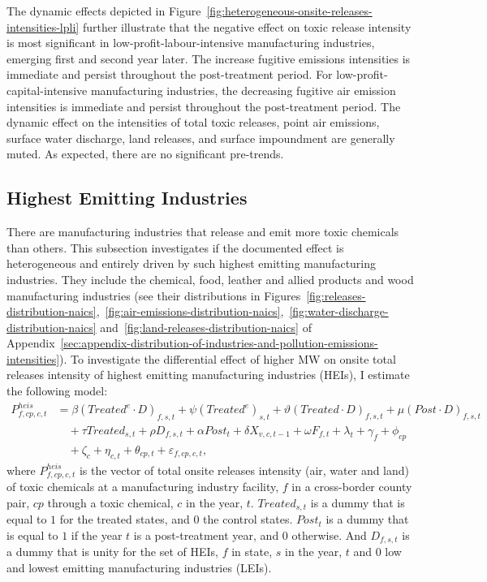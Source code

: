 \documentclass[12pt, english]{article}
\begin{document}
    The dynamic effects depicted in Figure~\ref{fig:heterogeneous-onsite-releases-intensities-lpli} further illustrate that the negative effect on toxic release intensity is most significant in low-profit-labour-intensive manufacturing industries, emerging first and second year later. The increase fugitive emissions intensities is immediate and persist throughout the post-treatment period. For low-profit-capital-intensive manufacturing industries, the decreasing fugitive air emission intensities is immediate and persist throughout the post-treatment period. The dynamic effect on the intensities of total toxic releases, point air emissions, surface water discharge, land releases, and surface impoundment are generally muted. As expected, there are no significant pre-trends.
    

    \subsection{Highest Emitting Industries}\label{subsec:highest-emitting-industries}
    There are manufacturing industries that release and emit more toxic chemicals than others. This subsection investigates if the documented effect is heterogeneous and entirely driven by such highest emitting manufacturing industries. They include the chemical, food, leather and allied products and wood manufacturing industries (see their distributions in Figures~\ref{fig:releases-distribution-naics},~\ref{fig:air-emissions-distribution-naics},~\ref{fig:water-discharge-distribution-naics} and~\ref{fig:land-releases-distribution-naics} of Appendix~\ref{sec:appendix-distribution-of-industries-and-pollution-emissions-intensities}). To investigate the differential effect of higher MW on onsite total releases intensity of highest emitting manufacturing industries (HEIs), I estimate the following model:
    \begin{align}
        P_{f,cp,c,t}^{heis} &= \beta (Treated^{e} \cdot D)_{f,s,t} + \psi (Treated^{e})_{s,t} + \vartheta (Treated \cdot D)_{f,s,t} + \mu (Post \cdot D)_{f,s,t} \nonumber \\
        &\quad + \tau Treated_{s,t} + \rho D_{f,s,t} + \alpha Post_{t} + \delta X_{v,c,t-1} + \omega F_{f,t} + \lambda_{t} + \gamma_{f} + \phi_{cp} \nonumber \\
        &\quad + \zeta_{c} + \eta_{c,t} + \theta_{cp,t} + \varepsilon_{f,cp,c,t},\label{eq:heterogeneous-onsite-releases-intensity-heis}
    \end{align}
    where $P_{f,cp,c,t}^{heis}$ is the vector of total onsite releases intensity (air, water and land) of toxic chemicals at a manufacturing industry facility, $f$ in a cross-border county pair, $cp$ through a toxic chemical, $c$ in the year, $t$. $Treated_{s,t}$ is a dummy that is equal to $1$ for the treated states, and $0$ the control states. $Post_{t}$ is a dummy that is equal to $1$ if the year $t$ is a post-treatment year, and $0$ otherwise. And $D_{f,s,t}$ is a dummy that is unity for the set of HEIs, $f$ in state, $s$ in the year, $t$ and $0$ low and lowest emitting manufacturing industries (LEIs).
    
\end{document}
